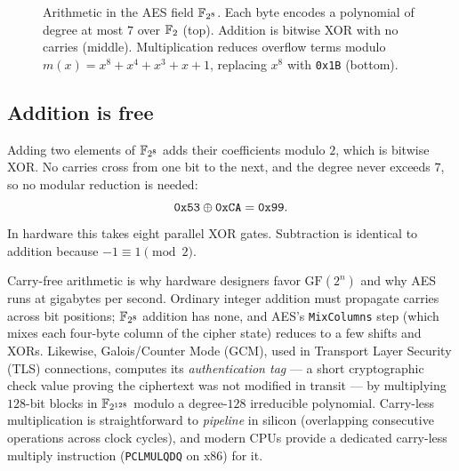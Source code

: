 \begin{figure}[htbp]
\caption{Arithmetic in the AES field $\mathbb{F}_{2^8}$. Each byte encodes a polynomial of degree at most $7$ over $\mathbb{F}_2$ (top). Addition is bitwise XOR with no carries (middle). Multiplication reduces overflow terms modulo $m(x) = x^8 + x^4 + x^3 + x + 1$, replacing $x^8$ with \texttt{0x1B} (bottom).}
\label{ch06:fig-f28-poly}
\end{figure}

\subsection{Addition is free}

Adding two elements of $\mathbb{F}_{2^8}$ adds their coefficients modulo $2$, which is
bitwise XOR. No carries cross from one bit to the next, and the degree never
exceeds $7$, so no modular reduction is needed:
\[
\texttt{0x53} \oplus \texttt{0xCA} = \texttt{0x99}.
\]
In hardware this takes eight parallel XOR gates. Subtraction is identical to
addition because $-1 \equiv 1 \pmod 2$.

\begin{applicationbox}
Carry-free arithmetic is why hardware designers favor $\mathrm{GF}(2^n)$ and
why AES runs at gigabytes per second. Ordinary integer addition must propagate
carries across bit positions; $\mathbb{F}_{2^8}$ addition has none, and AES's
\texttt{MixColumns} step (which mixes each four-byte column of the cipher
state) reduces to a few shifts and XORs. Likewise, Galois/Counter Mode (GCM),
used in Transport Layer Security (TLS) connections, computes its
\emph{authentication tag} --- a short cryptographic check value proving the
ciphertext was not modified in transit --- by multiplying $128$-bit blocks in
$\mathbb{F}_{2^{128}}$ modulo a degree-$128$ irreducible polynomial. Carry-less
multiplication is straightforward to \emph{pipeline} in silicon (overlapping
consecutive operations across clock cycles), and modern CPUs provide a
dedicated carry-less multiply instruction (\texttt{PCLMULQDQ} on x86) for it.
\end{applicationbox}

